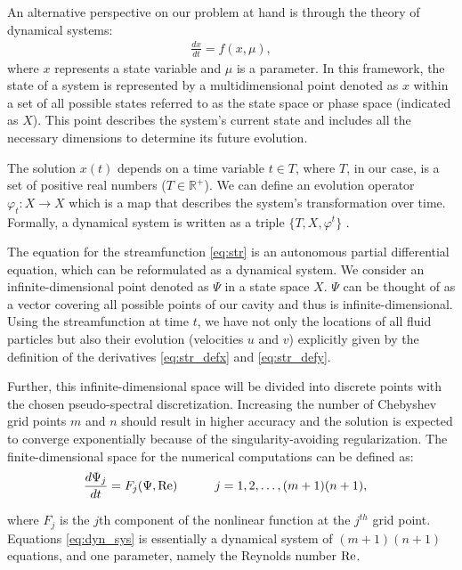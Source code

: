 An alternative perspective on our problem at hand is through the theory of
dynamical systems:
\begin{align}
  \frac{dx}{dt} = {f(x, \mu)}, \label{eq:dyn_sys_orig}
\end{align}
where $x$ represents a state variable and $\mu$ is a parameter. In this
framework, the state of a system is represented by a multidimensional point
denoted as $x$ within a set of all possible states referred to as the state
space or phase space (indicated as $X$). This point describes the system's
current state and includes all the necessary dimensions to determine its future
evolution.

The solution $x(t)$ depends on a time variable $t \in T$, where $T$, in our
case, is a set of positive real numbers ($T \in \mathbb{R}^+$). We can define
an evolution operator $\varphi_t : X \to X$ which is a map that describes the
system's transformation over time. Formally, a dynamical system is written as a
triple $\{ T, X, \varphi^t \}$ \citep{kuznetsov2004}.

The equation for the streamfunction \eqref{eq:str} is an autonomous partial
differential equation, which can be reformulated as a dynamical system. We
consider an infinite-dimensional point denoted as $\Psi$ in a state space $X$.
$\Psi$ can be thought of as a vector covering all possible points of our cavity
and thus is infinite-dimensional. Using the streamfunction at time $t$, we have
not only the locations of all fluid particles but also their evolution
(velocities $u$ and $v$) explicitly given by the definition of the derivatives
\eqref{eq:str_defx} and \eqref{eq:str_defy}.

Further, this infinite-dimensional space will be divided into discrete points
with the chosen pseudo-spectral discretization. Increasing the number of
Chebyshev grid points $m$ and $n$ should result in higher accuracy and the
solution is expected to converge exponentially because of the
singularity-avoiding regularization. The finite-dimensional space for the
numerical computations can be defined as:
\begin{align}
  \frac{d\Psi_j}{dt} &= {F_j(\Psi, \mathrm{Re})} \quad \quad \quad
    j= 1,2,\dots,(m+1)(n+1), \label{eq:dyn_sys}
\end{align}

where $F_j$ is the $j$th component of the nonlinear function at the $j^{th}$
grid point. Equations \eqref{eq:dyn_sys} is essentially a dynamical system of
$(m+1)(n+1)$ equations, and one parameter, namely the Reynolds number $\mathrm{Re}$.

